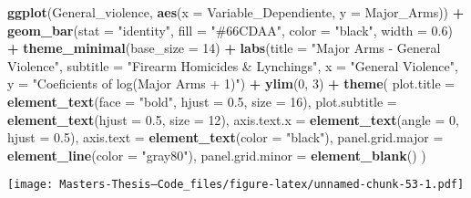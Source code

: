 \documentclass[
  11pt,
]{article}
\newenvironment{Shaded}{\begin{snugshade}}{\end{snugshade}}
\newcommand{\AttributeTok}[1]{\textcolor[rgb]{0.13,0.29,0.53}{#1}}
\newcommand{\DecValTok}[1]{\textcolor[rgb]{0.00,0.00,0.81}{#1}}
\newcommand{\FloatTok}[1]{\textcolor[rgb]{0.00,0.00,0.81}{#1}}
\newcommand{\FunctionTok}[1]{\textcolor[rgb]{0.13,0.29,0.53}{\textbf{#1}}}
\newcommand{\NormalTok}[1]{#1}
\newcommand{\SpecialCharTok}[1]{\textcolor[rgb]{0.81,0.36,0.00}{\textbf{#1}}}
\newcommand{\StringTok}[1]{\textcolor[rgb]{0.31,0.60,0.02}{#1}}
\begin{document}
\begin{Shaded}
\begin{Highlighting}[]
\FunctionTok{ggplot}\NormalTok{(General\_violence, }\FunctionTok{aes}\NormalTok{(}\AttributeTok{x =}\NormalTok{ Variable\_Dependiente, }\AttributeTok{y =}\NormalTok{ Major\_Arms)) }\SpecialCharTok{+}
  \FunctionTok{geom\_bar}\NormalTok{(}\AttributeTok{stat =} \StringTok{"identity"}\NormalTok{, }\AttributeTok{fill =} \StringTok{"\#66CDAA"}\NormalTok{, }\AttributeTok{color =} \StringTok{"black"}\NormalTok{, }\AttributeTok{width =} \FloatTok{0.6}\NormalTok{) }\SpecialCharTok{+}
  \FunctionTok{theme\_minimal}\NormalTok{(}\AttributeTok{base\_size =} \DecValTok{14}\NormalTok{) }\SpecialCharTok{+}
  \FunctionTok{labs}\NormalTok{(}\AttributeTok{title =} \StringTok{"Major Arms {-} General Violence"}\NormalTok{,}
       \AttributeTok{subtitle =} \StringTok{"Firearm Homicides \& Lynchings"}\NormalTok{,}
       \AttributeTok{x =} \StringTok{"General Violence"}\NormalTok{,}
       \AttributeTok{y =} \StringTok{"Coeficients of log(Major Arms + 1)"}\NormalTok{) }\SpecialCharTok{+}
  \FunctionTok{ylim}\NormalTok{(}\DecValTok{0}\NormalTok{, }\DecValTok{3}\NormalTok{) }\SpecialCharTok{+}
  \FunctionTok{theme}\NormalTok{(}
    \AttributeTok{plot.title =} \FunctionTok{element\_text}\NormalTok{(}\AttributeTok{face =} \StringTok{"bold"}\NormalTok{, }\AttributeTok{hjust =} \FloatTok{0.5}\NormalTok{, }\AttributeTok{size =} \DecValTok{16}\NormalTok{),}
    \AttributeTok{plot.subtitle =} \FunctionTok{element\_text}\NormalTok{(}\AttributeTok{hjust =} \FloatTok{0.5}\NormalTok{, }\AttributeTok{size =} \DecValTok{12}\NormalTok{),}
    \AttributeTok{axis.text.x =} \FunctionTok{element\_text}\NormalTok{(}\AttributeTok{angle =} \DecValTok{0}\NormalTok{, }\AttributeTok{hjust =} \FloatTok{0.5}\NormalTok{),}
    \AttributeTok{axis.text =} \FunctionTok{element\_text}\NormalTok{(}\AttributeTok{color =} \StringTok{"black"}\NormalTok{),}
    \AttributeTok{panel.grid.major =} \FunctionTok{element\_line}\NormalTok{(}\AttributeTok{color =} \StringTok{"gray80"}\NormalTok{),}
    \AttributeTok{panel.grid.minor =} \FunctionTok{element\_blank}\NormalTok{()}
\NormalTok{  )}
\end{Highlighting}
\end{Shaded}

\texttt{[image: Masters-Thesis--Code\_files/figure-latex/unnamed-chunk-53-1.pdf]}
\end{document}
